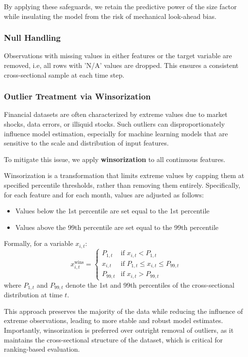\documentclass[11pt]{article}
\begin{document}
By applying these safeguards, we retain the predictive power of the size factor while insulating the model from the risk of mechanical look-ahead bias.

\subsubsection{Null Handling}

Observations with missing values in either features or the target variable are removed, i.e, all rows with 'N/A' values are dropped.
This ensures a consistent cross-sectional sample at each time step.

\subsubsection{Outlier Treatment via Winsorization}

Financial datasets are often characterized by extreme values due to market shocks, data errors, or illiquid stocks. Such outliers can disproportionately influence model estimation, especially for machine learning models that are sensitive to the scale and distribution of input features.

To mitigate this issue, we apply \textbf{winsorization} to all continuous features.

Winsorization is a transformation that limits extreme values by capping them at specified percentile thresholds, rather than removing them entirely. Specifically, for each feature and for each month, values are adjusted as follows:
\begin{itemize}
    \item Values below the 1st percentile are set equal to the 1st percentile
    \item Values above the 99th percentile are set equal to the 99th percentile
\end{itemize}

Formally, for a variable $x_{i,t}$:
\[
x^{\text{wins}}_{i,t} =
\begin{cases}
P_{1,t} & \text{if } x_{i,t} < P_{1,t} \\
x_{i,t} & \text{if } P_{1,t} \leq x_{i,t} \leq P_{99,t} \\
P_{99,t} & \text{if } x_{i,t} > P_{99,t}
\end{cases}
\]
where $P_{1,t}$ and $P_{99,t}$ denote the 1st and 99th percentiles of the cross-sectional distribution at time $t$.

This approach preserves the majority of the data while reducing the influence of extreme observations, leading to more stable and robust model estimates. Importantly, winsorization is preferred over outright removal of outliers, as it maintains the cross-sectional structure of the dataset, which is critical for ranking-based evaluation.
\end{document}

